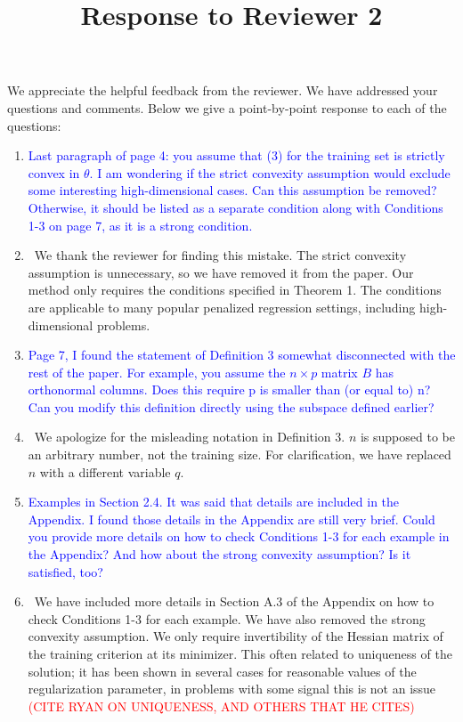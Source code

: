 \documentclass[]{article}
\title{Response to Reviewer 2}
\newcommand{\point}[1]{\item \textcolor{blue}{#1}}
\newcommand{\reply}{\item[]\ }
\begin{document}
	\maketitle
		
	We appreciate the helpful feedback from the reviewer. We have addressed your questions and comments. Below we give a point-by-point response to each of the questions:
		
	\begin{enumerate}
		\point{Last paragraph of page 4: you assume that (3) for the training set is strictly convex in $\theta$. I am wondering if the strict convexity assumption would exclude some interesting high-dimensional cases. Can this assumption be removed? Otherwise, it should be listed as a separate condition along with Conditions 1-3 on page 7, as it is a strong condition.}
		
		\reply We thank the reviewer for finding this mistake. The strict convexity assumption is unnecessary, so we have removed it from the paper. Our method only requires the conditions specified in Theorem 1. The conditions are applicable to many popular penalized regression settings, including high-dimensional problems.
		
		\point{Page 7, I found the statement of Definition 3 somewhat disconnected with the rest of the paper. For example, you assume the $n\times p$ matrix $B$ has orthonormal columns. Does this require p is smaller than (or equal to) n? Can you modify this definition directly using the subspace defined earlier?}
		
		\reply We apologize for the misleading notation in Definition 3. $n$ is supposed to be an arbitrary number, not the training size. For clarification, we have replaced $n$ with a different variable $q$. 
		
		
		\point{Examples in Section 2.4. It was said that details are included in the Appendix. I found those details in the Appendix are still very brief. Could you provide more details on how to check Conditions 1-3 for each example in the Appendix? And how about the strong convexity assumption? Is it satisfied, too?}
		
		\reply We have included more details in Section A.3 of the Appendix on how to check Conditions 1-3 for each example. We have also removed the strong convexity assumption. We only require invertibility of the Hessian matrix of the training criterion at its minimizer. This often related to uniqueness of the solution; it has been shown in several cases for reasonable values of the regularization parameter, in problems with some signal this is not an issue \textcolor{red}{(CITE RYAN ON UNIQUENESS, AND OTHERS THAT HE CITES)}
		

\end{enumerate}
\end{document}
